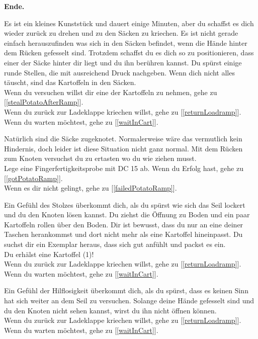 \textbf{Ende.}


Es ist ein kleines Kunststück und dauert einige Minuten, aber du schaffst es dich wieder zurück zu drehen und zu den Säcken zu kriechen. Es ist nicht gerade einfach herauszufinden was sich in den Säcken befindet, wenn die Hände hinter dem Rücken gefesselt sind. Trotzdem schaffst du es dich so zu positionieren, dass einer der Säcke hinter dir liegt und du ihn berühren kannst. Du spürst einige runde Stellen, die mit ausreichend Druck nachgeben. Wenn dich nicht alles täuscht, sind das Kartoffeln in den Säcken.
\\Wenn du versuchen willst dir eine der Kartoffeln zu nehmen, gehe zu [\ref{stealPotatoAfterRamp}].
\\Wenn du zurück zur Ladeklappe kriechen willst, gehe zu [\ref{returnLoadramp}].
\\Wenn du warten möchtest, gehe zu [\ref{waitInCart}].


Natürlich sind die Säcke zugeknotet. Normalerweise wäre das vermutlich kein Hindernis, doch leider ist diese Situation nicht ganz normal. Mit dem Rücken zum Knoten versuchst du zu ertasten wo du wie ziehen musst.
\\Lege eine Fingerfertigkeitsprobe mit DC 15 ab. Wenn du Erfolg hast, gehe zu [\ref{gotPotatoRamp}].
\\Wenn es dir nicht gelingt, gehe zu [\ref{failedPotatoRamp}].


Ein Gefühl des Stolzes überkommt dich, als du spürst wie sich das Seil lockert und du den Knoten lösen kannst. Du ziehst die Öffnung zu Boden und ein paar Kartoffeln rollen über den Boden. Dir ist bewusst, dass du nur an eine deiner Taschen herankommst und dort nicht mehr als eine Kartoffel hineinpasst. Du suchst dir ein Exemplar heraus, dass sich gut anfühlt und packst es ein.
\\Du erhälst eine Kartoffel (1)!
\\Wenn du zurück zur Ladeklappe kriechen willst, gehe zu [\ref{returnLoadramp}].
\\Wenn du warten möchtest, gehe zu [\ref{waitInCart}].


Ein Gefühl der Hilflosigkeit überkommt dich, als du spürst, dass es keinen Sinn hat sich weiter an dem Seil zu versuchen. Solange deine Hände gefesselt sind und du den Knoten nicht sehen kannst, wirst du ihn nicht öffnen können.
\\Wenn du zurück zur Ladeklappe kriechen willst, gehe zu [\ref{returnLoadramp}].
\\Wenn du warten möchtest, gehe zu [\ref{waitInCart}].

